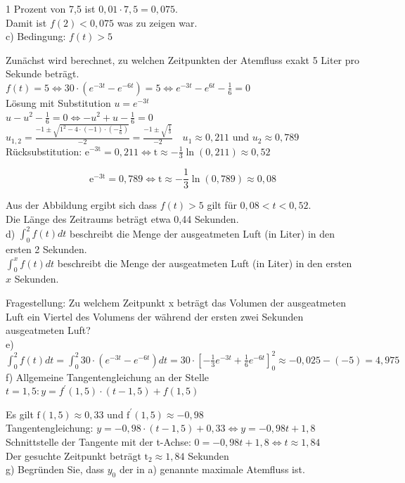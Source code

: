 \documentclass[10pt]{article}
\begin{document}
1 Prozent von 7,5 ist $0,01 \cdot 7,5=0,075$.\\
Damit ist $f(2)<0,075$ was zu zeigen war.\\
c) Bedingung: $f(t)>5$

Zunächst wird berechnet, zu welchen Zeitpunkten der Atemfluss exakt 5 Liter pro Sekunde beträgt.\\
$f(t)=5 \Leftrightarrow 30 \cdot\left(e^{-3 t}-e^{-6 t}\right)=5 \Leftrightarrow e^{-3 t}-e^{6 t}-\frac{1}{6}=0$\\
Lösung mit Substitution $u=e^{-3 t}$\\
$u-u^{2}-\frac{1}{6}=0 \Leftrightarrow-u^{2}+u-\frac{1}{6}=0$\\
$u_{1,2}=\frac{-1 \pm \sqrt{1^{2}-4 \cdot(-1) \cdot\left(-\frac{1}{6}\right)}}{-2}=\frac{-1 \pm \sqrt{\frac{1}{3}}}{-2} \quad u_{1} \approx 0,211$ und $u_{2} \approx 0,789$\\
Rücksubstitution: $\mathrm{e}^{-3 \mathrm{t}}=0,211 \Leftrightarrow \mathrm{t} \approx-\frac{1}{3} \ln (0,211) \approx 0,52$

$$
\mathrm{e}^{-3 \mathrm{t}}=0,789 \Leftrightarrow \mathrm{t} \approx-\frac{1}{3} \ln (0,789) \approx 0,08
$$

Aus der Abbildung ergibt sich dass $f(t)>5$ gilt für $0,08<t<0,52$.\\
Die Länge des Zeitraums beträgt etwa 0,44 Sekunden.\\
d) $\int_{0}^{2} f(t) d t$ beschreibt die Menge der ausgeatmeten Luft (in Liter) in den ersten 2 Sekunden.\\
$\int_{0}^{x} f(t) d t$ beschreibt die Menge der ausgeatmeten Luft (in Liter) in den ersten $x$ Sekunden.

Fragestellung: Zu welchem Zeitpunkt x beträgt das Volumen der ausgeatmeten Luft ein Viertel des Volumens der während der ersten zwei Sekunden ausgeatmeten Luft?\\
e) $\int_{0}^{2} f(t) d t=\int_{0}^{2} 30 \cdot\left(e^{-3 t}-e^{-6 t}\right) d t=30 \cdot\left[-\frac{1}{3} e^{-3 t}+\frac{1}{6} e^{-6 t}\right]_{0}^{2} \approx-0,025-(-5)=4,975$\\
f) Allgemeine Tangentengleichung an der Stelle $t=1,5: y=f^{\prime}(1,5) \cdot(t-1,5)+f(1,5)$

Es gilt $\mathrm{f}(1,5) \approx 0,33$ und $\mathrm{f}^{\prime}(1,5) \approx-0,98$\\
Tangentengleichung: $y=-0,98 \cdot(t-1,5)+0,33 \Leftrightarrow y=-0,98 t+1,8$\\
Schnittstelle der Tangente mit der t-Achse: $0=-0,98 t+1,8 \Leftrightarrow t \approx 1,84$\\
Der gesuchte Zeitpunkt beträgt $\mathrm{t}_{2} \approx 1,84$ Sekunden\\
g) Begründen Sie, dass $y_{0}$ der in a) genannte maximale Atemfluss ist.
\end{document}
